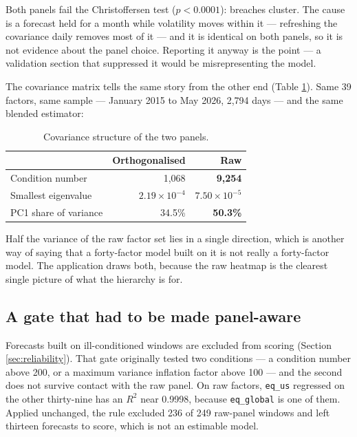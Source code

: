 \documentclass[11pt,a4paper]{article}
\newcommand{\code}[1]{\texttt{\small #1}}
\begin{document}
Both panels fail the Christoffersen test ($p<0.0001$): breaches cluster. The cause
is a forecast held for a month while volatility moves within it --- refreshing the
covariance daily removes most of it --- and it is identical on both panels, so it is
not evidence about the panel choice. Reporting it anyway is the
point --- a validation section that suppressed it would be misrepresenting the model.

The covariance matrix tells the same story from the other end (Table
\ref{tab:covpanels}). Same 39 factors, same sample --- January 2015 to May 2026,
2{,}794 days --- and the same blended estimator:

\begin{table}[htbp]
\centering
\caption{Covariance structure of the two panels.}
\label{tab:covpanels}
\small
\begin{tabular}{@{}lrr@{}}
\toprule
 & \textbf{Orthogonalised} & \textbf{Raw} \\
\midrule
Condition number & 1{,}068 & \textbf{9{,}254} \\
Smallest eigenvalue & $2.19\times10^{-4}$ & $7.50\times10^{-5}$ \\
PC1 share of variance & 34.5\% & \textbf{50.3\%} \\
\bottomrule
\end{tabular}
\end{table}

Half the variance of the raw factor set lies in a single direction, which is another
way of saying that a forty-factor model built on it is not really a forty-factor
model. The application draws both, because the raw heatmap is the clearest single
picture of what the hierarchy is for.

\subsection{A gate that had to be made panel-aware}
\label{sec:gate}

Forecasts built on ill-conditioned windows are excluded from scoring (Section
\ref{sec:reliability}). That gate originally tested two conditions --- a condition
number above 200, or a maximum variance inflation factor above 100 --- and the second
does not survive contact with the raw panel. On raw factors, \code{eq\_us} regressed
on the other thirty-nine has an $R^2$ near 0.9998, because \code{eq\_global} is one of
them. Applied unchanged, the rule excluded 236 of 249 raw-panel windows and left
thirteen forecasts to score, which is not an estimable model.
\end{document}
